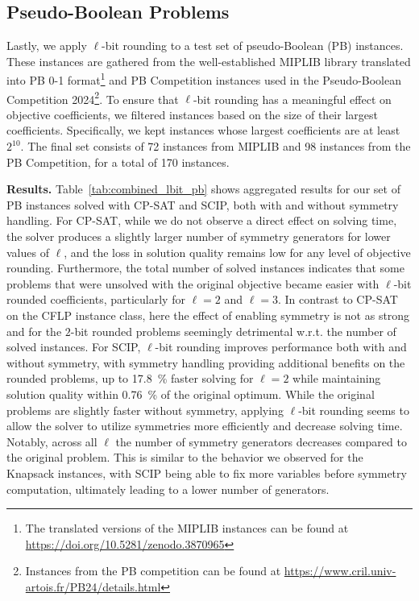 \documentclass[runningheads]{llncs}
\begin{document}
\subsection{Pseudo-Boolean Problems}
Lastly, we apply $\ell$-bit rounding to a test set of pseudo-Boolean (PB) instances. These instances are gathered from the well-established MIPLIB library \cite{miplib2017} translated into PB 0-1 format\footnote{The translated versions of the MIPLIB instances can be found at \url{ https://doi.org/10.5281/zenodo.3870965}} \cite{devriendt2021learn} and PB Competition instances used in the Pseudo-Boolean Competition 2024\footnote{Instances from the PB competition can be found at \url{https://www.cril.univ-artois.fr/PB24/details.html}}.
To ensure that $\ell$-bit rounding has a meaningful effect on objective coefficients, we filtered instances based on the size of their largest coefficients. Specifically, we kept instances whose largest coefficients are at least $2^{10}$. The final set consists of 72 instances from MIPLIB and 98 instances from the PB Competition, for a total of 170 instances.

\textbf{Results.}\label{sec:results_pb}
Table~\ref{tab:combined_lbit_pb} shows aggregated results for our set of PB instances solved with CP-SAT and SCIP, both with and without symmetry handling.
%
For CP-SAT, while we do not observe a direct effect on solving time, the solver produces a slightly larger number of symmetry generators for lower values of $\ell$, and the loss in solution quality remains low for any level of objective rounding. Furthermore, the total number of solved instances indicates that some problems that were unsolved with the original objective became easier with $\ell$-bit rounded coefficients, particularly for $\ell=2$ and $\ell=3$.
%
In contrast to CP-SAT on the CFLP instance class, here the effect of enabling symmetry is not as strong and for the $2$-bit rounded problems seemingly detrimental w.r.t. the number of solved instances.
%
For SCIP, $\ell$-bit rounding improves performance both with and without symmetry, with symmetry handling providing additional benefits on the rounded problems, up to \SI{17,8}{\percent} faster solving for $\ell=2$ while maintaining solution 
quality within \SI{0.76}{\percent} of the original optimum.
While the original problems are slightly faster without symmetry, applying $\ell$-bit rounding seems to allow the solver to utilize symmetries more efficiently and decrease solving time. 
Notably, across all $\ell$ the number of symmetry generators decreases compared to the original problem. This is similar to the behavior we observed for the Knapsack instances, with SCIP being able to fix more variables before symmetry computation, ultimately leading to a lower number of generators.
\end{document}
